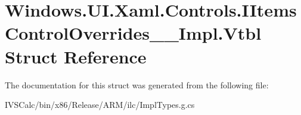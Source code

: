 \hypertarget{struct_windows_1_1_u_i_1_1_xaml_1_1_controls_1_1_i_items_control_overrides_____impl_1_1_vtbl}{}\section{Windows.\+U\+I.\+Xaml.\+Controls.\+I\+Items\+Control\+Overrides\+\_\+\+\_\+\+Impl.\+Vtbl Struct Reference}
\label{struct_windows_1_1_u_i_1_1_xaml_1_1_controls_1_1_i_items_control_overrides_____impl_1_1_vtbl}


The documentation for this struct was generated from the following file\+:\begin{DoxyCompactItemize}
\item 
I\+V\+S\+Calc/bin/x86/\+Release/\+A\+R\+M/ilc/Impl\+Types.\+g.\+cs\end{DoxyCompactItemize}

